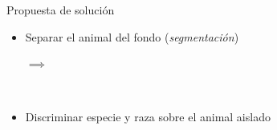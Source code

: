 \documentclass{beamer}
\begin{document}
\begin{frame}{Propuesta de solución}
    \begin{itemize}
        \item Separar el animal del fondo (\emph{segmentación})
            \pause
            \begin{center}
                \pause
                $\implies$
            \end{center}
            \pause
            \ \\ 
        \item Discriminar especie y raza sobre el animal aislado

\end{itemize}
\end{frame}
\end{document}
